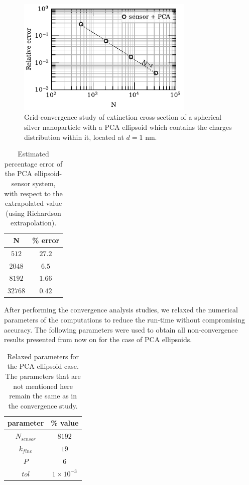 \begin{figure}%
    \centering
    \includegraphics[width=0.75\textwidth]{convergence_sensor_pca_w380.pdf} 
    \caption{Grid-convergence study of extinction cross-section of a spherical silver
             nanoparticle with a PCA ellipsoid which contains 
             the charges distribution within it, located at $d=1$ nm.}
    \label{fig:err_sph-pca}
 \end{figure}

 \begin{table}%
    \centering
    \caption{\label{table:err_sph-pca} Estimated percentage error of the PCA ellipsoid-sensor 
    system, with respect to the extrapolated value (using Richardson extrapolation).} 
    \begin{tabular}{c c}
    \hline%
    N & \% error \\
    \hline%
     $512$ & $27.2$ \\
     $2048$ & $6.5$ \\
     $8192$ & $1.66$ \\
     $32768$ & $0.42$ \\
    \hline%
    \end{tabular}
\end{table}

After performing the convergence analysis studies, we relaxed the numerical parameters of the computations to reduce the run-time without 
compromising accuracy. The following parameters were used to obtain all non-convergence results presented from now on for the case of PCA ellipsoids.

\begin{table}%
    \centering
    \caption{\label{table:rel_pca_par} Relaxed parameters for the PCA ellipsoid case. The parameters that are not 
    mentioned here remain the same as in the convergence study.} 
    \begin{tabular}{c c}
    \hline%
    parameter & \% value \\
    \hline%
     $N_{sensor}$ & $8192$ \\
     $k_{fine}$ & $19$ \\
     $P$ & $6$ \\
     $tol$ & $1\times 10^{-3}$ \\
    \hline%
    \end{tabular}
\end{table}

